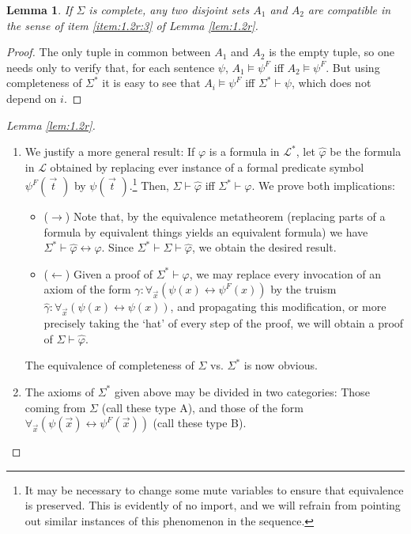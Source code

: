 \documentclass{article}
\newtheorem{lemma}[theorem]{Lemma}
\theoremstyle{nonumberplain}
\newtheorem{proof}{Proof}
\newcommand{\Lang}{\mathcal{L}}
\begin{document}
\begin{lemma}\label{lem:compatible}
If $\Sigma$ is complete, any two disjoint sets $A_1$ and $A_2$ are compatible in the sense of item \ref{item:1.2r:3} of Lemma \ref{lem:1.2r}.
\end{lemma}

\begin{proof}
The only tuple in common between $A_1$ and $A_2$ is the empty tuple, so one needs only to verify that, for each sentence $\psi$, $A_1 \vDash \psi^F$ iff $A_2 \vDash \psi^F$. But using completeness of $\Sigma^*$ it is easy to see that $A_i \vDash \psi^F$ iff $\Sigma^* \vdash \psi$, which does not depend on $i$.
\end{proof}

\begin{proof}[Lemma \ref{lem:1.2r}]
\leavevmode
\begin{enumerate}
\item We justify a more general result: If $\varphi$ is a formula in $\Lang^*$, let $\hat\varphi$ be the formula in $\Lang$ obtained by replacing ever instance of a formal predicate symbol $\psi^F(\,\vec{t\!}\,\,)$ by $\psi(\,\vec{t\!}\,\,)$.\footnote{It may be necessary to change some mute variables to ensure that equivalence is preserved. This is evidently of no import, and we will refrain from pointing out similar instances of this phenomenon in the sequence.} Then, $\Sigma \vdash \hat\varphi$ iff $\Sigma^* \vdash \varphi$. We prove both implications:
\begin{itemize}
\item ($\rightarrow$) Note that, by the equivalence metatheorem (replacing parts of a formula by equivalent things yields an equivalent formula) we have $\Sigma^* \vdash \hat\varphi \leftrightarrow \varphi$. Since $\Sigma^* \vdash \Sigma \vdash \hat\varphi$, we obtain the desired result.
\item ($\leftarrow$) Given a proof of $\Sigma^* \vdash \varphi$, we may replace every invocation of an axiom of the form $\gamma \colon \forall_{\vec x} (\psi(x) \leftrightarrow \psi^F(x))$ by the truism $\hat\gamma \colon \forall_{\vec x} (\psi(x) \leftrightarrow \psi(x))$, and propagating this modification, or more precisely taking the `hat' of every step of the proof, we will obtain a proof of $\Sigma \vdash \hat\varphi$.
\end{itemize}

The equivalence of completeness of $\Sigma$ vs. $\Sigma^*$ is now obvious.

\item The axioms of $\Sigma^*$ given above may be divided in two categories: Those coming from $\Sigma$ (call these type A), and those of the form $\forall_{\vec x} (\psi(\vec x) \leftrightarrow \psi^F(\vec x))$ (call these type B).


\end{enumerate}
\end{proof}
\end{document}
